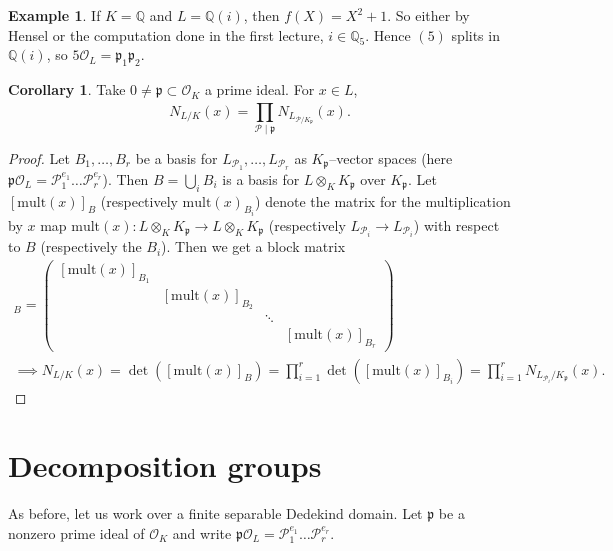 \documentclass{article}
\theoremstyle{definition}
\newtheorem{cor}[theorem]{Corollary}
\newtheorem{example}{Example}[section]
\begin{document}
\begin{example}
    If $K=\mathbb{Q}$ and $L = \mathbb{Q}(i)$, then $f(X)=X^2+1$. So either by Hensel or the computation done in the first lecture, $i \in \mathbb{Q}_{5}$. Hence $(5)$ splits in $\mathbb{Q}(i)$, so $5\mathcal{O}_L = \mathfrak{p}_1 \mathfrak{p}_2$.
\end{example}


\begin{cor}\label{cor10.10}
    Take $0 \neq \mathfrak{p} \subset \mathcal{O}_K$ a prime ideal. For $x \in L$, $$N_{L/K}(x) = \prod_{\mathcal{P} \mid  \mathfrak{p}}^{} N_{L_{\mathcal{P}/K_{\mathfrak{p}}}}(x).$$
\end{cor}
\begin{proof}
    Let $B_1,\ldots,B_r$ be a basis for $L_{\mathcal{P}_1},\ldots, L_{\mathcal{P}_r}$ as $K_{\mathfrak{p}}$--vector spaces (here $\mathfrak{p}\mathcal{O}_L = \mathcal{P}_1^{e_1}\ldots \mathcal{P}_r^{e_r}$). Then $B = \bigcup_{i} B_i$ is a basis for $L \otimes_K K_{\mathfrak{p}}$ over $K_{\mathfrak{p}}$. Let $[\text{mult}(x)]_{B}$ (respectively $\text{mult}(x)_{B_i}$) denote the matrix for the multiplication by $x$ map $\text{mult}(x) : L \otimes_K K_{\mathfrak{p}} \to L \otimes_K K_{\mathfrak{p}}$ (respectively $L_{\mathcal{P}_i} \to L_{\mathcal{P}_i}$) with respect to $B$ (respectively the $B_i$). Then we get a block matrix
    \begin{align*}
        [\text{mult}(x)]_B = \begin{pmatrix} [\text{mult}(x)]_{B_1} & & \\
        & [\text{mult}(x)]_{B_2} & \\ & &\ddots & \\ & & & [\text{mult}(x)]_{B_r} \end{pmatrix}
        \\
        \implies N_{L/K}(x) = \det([\text{mult}(x)]_B) = \prod_{i=1}^{r} \det([\text{mult}(x)]_{B_i}) = \prod_{i=1}^{r} N_{L_{\mathcal{P}_i}/K_{\mathfrak{p}}}(x).
    \end{align*}
\end{proof}

\section{Decomposition groups}
As before, let us work over a finite separable Dedekind domain. Let $\mathfrak{p}$ be a nonzero prime ideal of $\mathcal{O}_K$ and write $\mathfrak{p}\mathcal{O}_L = \mathcal{P}_1^{e_1}\ldots \mathcal{P}_r^{e_r}$.
\vspace{1mm}
 
\end{document}
